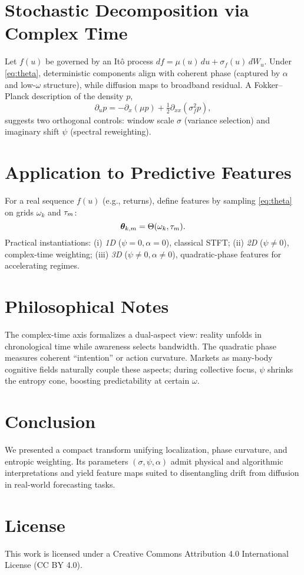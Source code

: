 \documentclass[11pt]{article}
\begin{document}
\section{Stochastic Decomposition via Complex Time}
Let $f(u)$ be governed by an It\^o process $df=\mu(u)\,du+\sigma_f(u)\,dW_u$. Under \eqref{eq:theta}, deterministic components align with coherent phase (captured by $\alpha$ and low-$\omega$ structure), while diffusion maps to broadband residual. A Fokker--Planck description of the density $p$,
\begin{equation}
\partial_u p = -\partial_x(\mu p) + \tfrac12 \partial_{xx}(\sigma_f^2 p),
\end{equation}
suggests two orthogonal controls: window scale $\sigma$ (variance selection) and imaginary shift $\psi$ (spectral reweighting).

\section{Application to Predictive Features}
For a real sequence $f(u)$ (e.g., returns), define features by sampling \eqref{eq:theta} on grids $\omega_k$ and $\tau_m$:
\begin{equation}
\bm{\theta}_{k,m}=\Theta(\omega_k,\tau_m).
\end{equation}
Practical instantiations: (i) \emph{1D} ($\psi=0,\alpha=0$), classical STFT; (ii) \emph{2D} ($\psi\neq0$), complex-time weighting; (iii) \emph{3D} ($\psi\neq0, \alpha\neq0$), quadratic-phase features for accelerating regimes.

\section{Philosophical Notes}
The complex-time axis formalizes a dual-aspect view: reality unfolds in chronological time while awareness selects bandwidth. The quadratic phase measures coherent ``intention'' or action curvature. Markets as many-body cognitive fields naturally couple these aspects; during collective focus, $\psi$ shrinks the entropy cone, boosting predictability at certain $\omega$.

\section{Conclusion}
We presented a compact transform unifying localization, phase curvature, and entropic weighting. Its parameters $(\sigma,\psi,\alpha)$ admit physical and algorithmic interpretations and yield feature maps suited to disentangling drift from diffusion in real-world forecasting tasks.




\section*{License}
This work is licensed under a Creative Commons Attribution 4.0 International License (CC BY 4.0).
\end{document}
